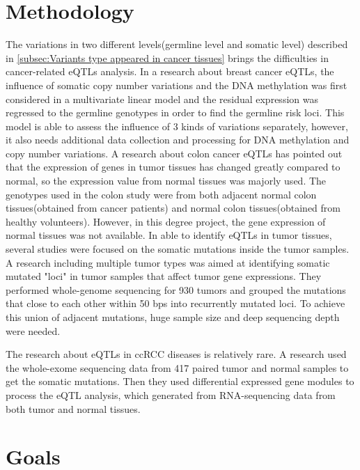 \section{Methodology}

The variations in two different levels(germline level and somatic level) described in \ref{subsec:Variants type appeared in cancer tissues} brings the difficulties in cancer-related eQTLs analysis. In a research about breast cancer eQTLs\cite{li_integrative_2013}, the influence of somatic copy number variations and the DNA methylation was first considered in a multivariate linear model and the residual expression was regressed to the germline genotypes in order to find the germline risk loci. This model is able to assess the influence of 3 kinds of variations separately, however, it also needs additional data collection and processing for DNA methylation and copy number variations. A research about colon cancer eQTLs\cite{moreno_colon-specific_2018} has pointed out that the expression of genes in tumor tissues has changed greatly compared to normal, so the expression value from normal tissues was majorly used. The genotypes used in the colon study were from both adjacent normal colon tissues(obtained from cancer patients) and normal colon tissues(obtained from healthy volunteers). However, in this degree project, the gene expression of normal tissues was not available. In able to identify eQTLs in tumor tissues, several studies were focused on the somatic mutations inside the tumor samples. A research including multiple tumor types\cite{zhang_global_2018} was aimed at identifying somatic mutated "loci" in tumor samples that affect tumor gene expressions. They performed whole-genome sequencing for 930 tumors and grouped the mutations that close to each other within 50 bps into recurrently mutated loci. To achieve this union of adjacent mutations, huge sample size and deep sequencing depth were needed. 

The research about eQTLs in ccRCC diseases is relatively rare. A research\cite{yang_gene_2017} used the whole-exome sequencing data from 417 paired tumor and normal samples to get the somatic mutations. Then they used differential expressed gene modules to process the eQTL analysis, which generated from RNA-sequencing data from both tumor and normal tissues. 


\section{Goals}

